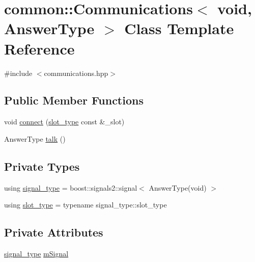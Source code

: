 \hypertarget{classcommon_1_1Communications_3_01void_00_01AnswerType_01_4}{}\section{common\+:\+:Communications$<$ void, Answer\+Type $>$ Class Template Reference}
\label{classcommon_1_1Communications_3_01void_00_01AnswerType_01_4}


{\ttfamily \#include $<$communications.\+hpp$>$}

\subsection*{Public Member Functions}
\begin{DoxyCompactItemize}
\item 
void \mbox{\hyperlink{classcommon_1_1Communications_3_01void_00_01AnswerType_01_4_a9af8cbc313e76392f6ba7be39e097be3}{connect}} (\mbox{\hyperlink{classcommon_1_1Communications_3_01void_00_01AnswerType_01_4_ae2ac44b26adf6e9b509a91ad4d2c429a}{slot\+\_\+type}} const \&\+\_\+slot)
\item 
Answer\+Type \mbox{\hyperlink{classcommon_1_1Communications_3_01void_00_01AnswerType_01_4_afbb6280b2f1e9d5805e0cedb055c66df}{talk}} ()
\end{DoxyCompactItemize}
\subsection*{Private Types}
\begin{DoxyCompactItemize}
\item 
using \mbox{\hyperlink{classcommon_1_1Communications_3_01void_00_01AnswerType_01_4_aa7d23e7da9af7eb33112dc11fd3ec8aa}{signal\+\_\+type}} = boost\+::signals2\+::signal$<$ Answer\+Type(void) $>$
\item 
using \mbox{\hyperlink{classcommon_1_1Communications_3_01void_00_01AnswerType_01_4_ae2ac44b26adf6e9b509a91ad4d2c429a}{slot\+\_\+type}} = typename signal\+\_\+type\+::slot\+\_\+type
\end{DoxyCompactItemize}
\subsection*{Private Attributes}
\begin{DoxyCompactItemize}
\item 
\mbox{\hyperlink{classcommon_1_1Communications_3_01void_00_01AnswerType_01_4_aa7d23e7da9af7eb33112dc11fd3ec8aa}{signal\+\_\+type}} \mbox{\hyperlink{classcommon_1_1Communications_3_01void_00_01AnswerType_01_4_ab80bea13198739a77ad862c570c458b4}{m\+Signal}}
\end{DoxyCompactItemize}


